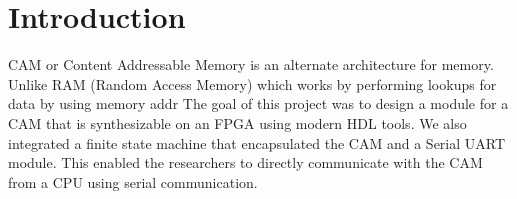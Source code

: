 \section{Introduction}
CAM or Content Addressable Memory is an alternate architecture for memory. Unlike RAM (Random Access Memory) which works by performing lookups for data by using memory addr
The goal of this project was to design a module for a CAM that is synthesizable on an FPGA using modern HDL tools. 
We also integrated a finite state machine that encapsulated the CAM and a Serial UART module. 
This enabled the researchers to directly communicate with the CAM from a CPU using serial communication. 
